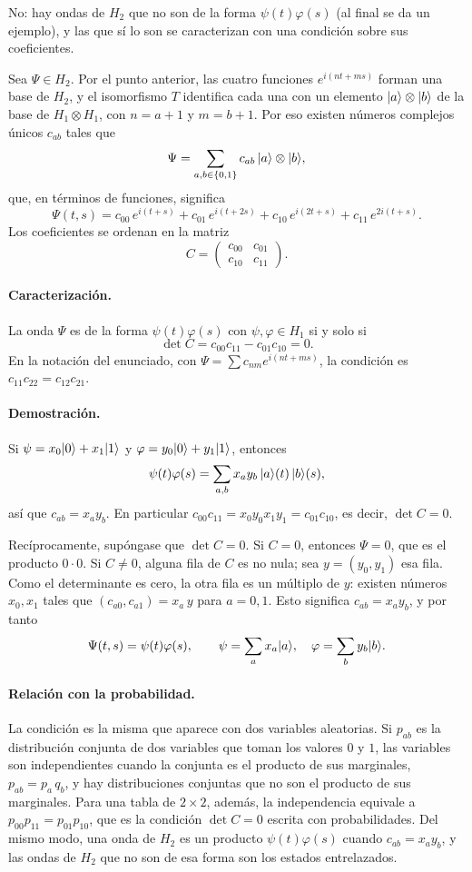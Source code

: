 No: hay ondas de $H_2$ que no son de la forma $\psi(t)\varphi(s)$ (al final se da un ejemplo), y las que sí lo son se caracterizan con una condición sobre sus coeficientes.

Sea $\Psi\in H_2$. Por el punto anterior, las cuatro funciones $e^{i(nt+ms)}$ forman una base de $H_2$, y el isomorfismo $T$ identifica cada una con un elemento $\lvert a\rangle\otimes\lvert b\rangle$ de la base de $H_1\otimes H_1$, con $n=a+1$ y $m=b+1$. Por eso existen números complejos únicos $c_{ab}$ tales que
\[
  \Psi=\sum_{a,b\in\{0,1\}}c_{ab}\,\lvert a\rangle\otimes\lvert b\rangle ,
\]
que, en términos de funciones, significa
\[
  \Psi(t,s)=c_{00}\,e^{i(t+s)}+c_{01}\,e^{i(t+2s)}+c_{10}\,e^{i(2t+s)}+c_{11}\,e^{2i(t+s)} .
\]
Los coeficientes se ordenan en la matriz
\[
  C=\begin{pmatrix}c_{00}&c_{01}\\ c_{10}&c_{11}\end{pmatrix}.
\]

\paragraph{Caracterización.} La onda $\Psi$ es de la forma $\psi(t)\varphi(s)$ con $\psi,\varphi\in H_1$ si y solo si
\[
  \det C=c_{00}c_{11}-c_{01}c_{10}=0 .
\]
En la notación del enunciado, con $\Psi=\sum c_{nm}e^{i(nt+ms)}$, la condición es $c_{11}c_{22}=c_{12}c_{21}$.

\paragraph{Demostración.} Si $\psi=x_0\lvert 0\rangle+x_1\lvert 1\rangle$ y $\varphi=y_0\lvert 0\rangle+y_1\lvert 1\rangle$, entonces
\[
  \psi(t)\varphi(s)=\sum_{a,b}x_a y_b\,\lvert a\rangle(t)\,\lvert b\rangle(s),
\]
así que $c_{ab}=x_a y_b$. En particular $c_{00}c_{11}=x_0y_0x_1y_1=c_{01}c_{10}$, es decir, $\det C=0$.

Recíprocamente, supóngase que $\det C=0$. Si $C=0$, entonces $\Psi=0$, que es el producto $0\cdot0$. Si $C\neq0$, alguna fila de $C$ es no nula; sea $y=(y_0,y_1)$ esa fila. Como el determinante es cero, la otra fila es un múltiplo de $y$: existen números $x_0,x_1$ tales que $(c_{a0},c_{a1})=x_a\,y$ para $a=0,1$. Esto significa $c_{ab}=x_a y_b$, y por tanto
\[
  \Psi(t,s)=\psi(t)\varphi(s), \qquad \psi=\sum_a x_a\lvert a\rangle,\quad \varphi=\sum_b y_b\lvert b\rangle .
\]

\paragraph{Relación con la probabilidad.} La condición es la misma que aparece con dos variables aleatorias. Si $p_{ab}$ es la distribución conjunta de dos variables que toman los valores $0$ y $1$, las variables son independientes cuando la conjunta es el producto de sus marginales, $p_{ab}=p_a\,q_b$, y hay distribuciones conjuntas que no son el producto de sus marginales. Para una tabla de $2\times2$, además, la independencia equivale a $p_{00}p_{11}=p_{01}p_{10}$, que es la condición $\det C=0$ escrita con probabilidades. Del mismo modo, una onda de $H_2$ es un producto $\psi(t)\varphi(s)$ cuando $c_{ab}=x_ay_b$, y las ondas de $H_2$ que no son de esa forma son los estados entrelazados.


